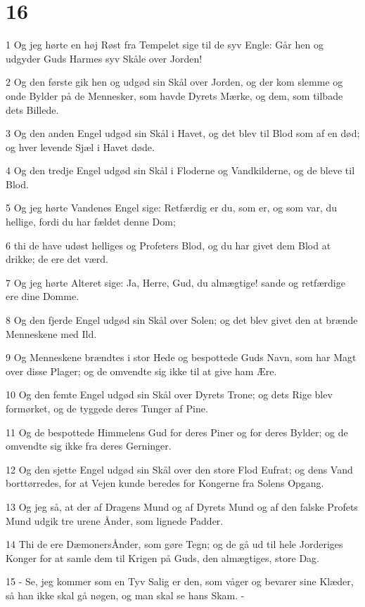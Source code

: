 \chapter{16}

\par 1 Og jeg hørte en høj Røst fra Tempelet sige til de syv Engle: Går hen og udgyder Guds Harmes syv Skåle over Jorden!
\par 2 Og den første gik hen og udgød sin Skål over Jorden, og der kom slemme og onde Bylder på de Mennesker, som havde Dyrets Mærke, og dem, som tilbade dets Billede.
\par 3 Og den anden Engel udgød sin Skål i Havet, og det blev til Blod som af en død; og hver levende Sjæl i Havet døde.
\par 4 Og den tredje Engel udgød sin Skål i Floderne og Vandkilderne, og de bleve til Blod.
\par 5 Og jeg hørte Vandenes Engel sige: Retfærdig er du, som er, og som var, du hellige, fordi du har fældet denne Dom;
\par 6 thi de have udøst helliges og Profeters Blod, og du har givet dem Blod at drikke; de ere det værd.
\par 7 Og jeg hørte Alteret sige: Ja, Herre, Gud, du almægtige! sande og retfærdige ere dine Domme.
\par 8 Og den fjerde Engel udgød sin Skål over Solen; og det blev givet den at brænde Menneskene med Ild.
\par 9 Og Menneskene brændtes i stor Hede og bespottede Guds Navn, som har Magt over disse Plager; og de omvendte sig ikke til at give ham Ære.
\par 10 Og den femte Engel udgød sin Skål over Dyrets Trone; og dets Rige blev formørket, og de tyggede deres Tunger af Pine.
\par 11 Og de bespottede Himmelens Gud for deres Piner og for deres Bylder; og de omvendte sig ikke fra deres Gerninger.
\par 12 Og den sjette Engel udgød sin Skål over den store Flod Eufrat; og dens Vand borttørredes, for at Vejen kunde beredes for Kongerne fra Solens Opgang.
\par 13 Og jeg så, at der af Dragens Mund og af Dyrets Mund og af den falske Profets Mund udgik tre urene Ånder, som lignede Padder.
\par 14 Thi de ere DæmonersÅnder, som gøre Tegn; og de gå ud til hele Jorderiges Konger for at samle dem til Krigen på Guds, den almægtiges, store Dag.
\par 15 - Se, jeg kommer som en Tyv Salig er den, som våger og bevarer sine Klæder, så han ikke skal gå nøgen, og man skal se hans Skam. -
